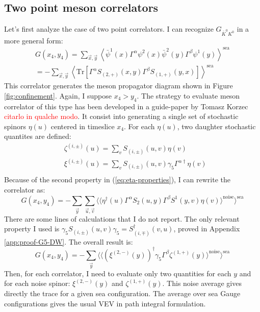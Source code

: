 \documentclass[english, LaM, oneside, noexaminfo]{sapthesis}
\newcommand{\la}{\langle}
\newcommand{\ra}{\rangle}
\newcommand{\colr}{\textcolor{red}}
\newcommand{\tr}{\text{Tr}}
\begin{document}
\subsection*{Two point meson correlators}
\noindent
Let's first analyze the case of two point correlators.
I can recognize $G_{\bar K^0 K^0}$ in a more general form:
\begin{equation}\label{eq:2pts-correlator-prototype}
    \begin{gathered}
        G(x_4,y_4) = \sum_{\vec x, \vec y} \left\la \bar\psi^1 (x) \Gamma^\alpha \psi^2 (x) \bar\psi^2 (y) \Gamma^\beta \psi^1 (y) \right\ra^\text{sea} \\
        = -  \sum_{\vec x, \vec y} \left\la \tr \left[ \Gamma^\alpha S_{(2,+)} (x,y) \Gamma^\beta S_{(1,+)} (y,x) \right] \right\ra^\text{sea}
    \end{gathered}
\end{equation}
This correlator generates the meson propagator diagram shown in Figure \ref{fig:confinement}.
Again, I suppose $x_4 > y_4$.
The strategy to evaluate meson correlator of this type has been developed in a guide-paper by Tomasz Korzec \colr{citarlo in qualche modo}.
It consist into generating a single set of stochastic spinors $\eta (u)$ centered in timeslice $x_4$.
For each $\eta (u)$, two daughter stochastic quantites are defined:
\begin{equation*}
    \begin{split}
        & \zeta^{(i,\pm)} (u) = \sum_v S_{(i,\pm)}(u,v) \eta (v) \\
        & \xi^{(i,\pm)} (u) = \sum_v S_{(i,\pm)}(u,v) \gamma_5 \Gamma^{\alpha\dag} \eta (v) \\
    \end{split}
\end{equation*}
Because of the second property in (\ref{eq:eta-properties}), I can rewrite the correlator as:
\begin{equation*}
    G(x_4,y_4) = -\sum_{\vec y} \sum_{\vec u, \vec v}  \bigg\langle \Big\langle \eta^\dag(u) \Gamma^\alpha S_2 (u,y) \Gamma^\beta S^1 (y,v) \eta(v) \Big\rangle^\text{noise} \bigg\rangle^{\text{sea}} 
\end{equation*}
There are some lines of calculations that I do not report.
The only relevant property I used is $\gamma_5 S_{(i,\pm)} (u,v) \gamma_5 = S_{(i,\mp)}^\dag (v,u)$, proved in Appendix \ref{app:proof-G5-DW}.
The overall result is:
\begin{equation*}
    G(x_4,y_4) = -\sum_{\vec y} \Bigg\langle \bigg\langle \left(\xi^{(2,-)}(y)\right)^\dag \gamma_5 \Gamma^\beta \zeta^{(1,+)}(y) \bigg\rangle^\text{noise} \Bigg\rangle^{\text{sea}} 
\end{equation*}
Then, for each correlator, I need to evaluate only two quantities for each $y$ and for each noise spinor: $\xi^{(2,-)}(y)$ and $\zeta^{(1,+)}(y)$.
This noise average gives directly the trace for a given sea configuration.
The average over sea Gauge configurations gives the usual VEV in path integral formulation.
\end{document}

